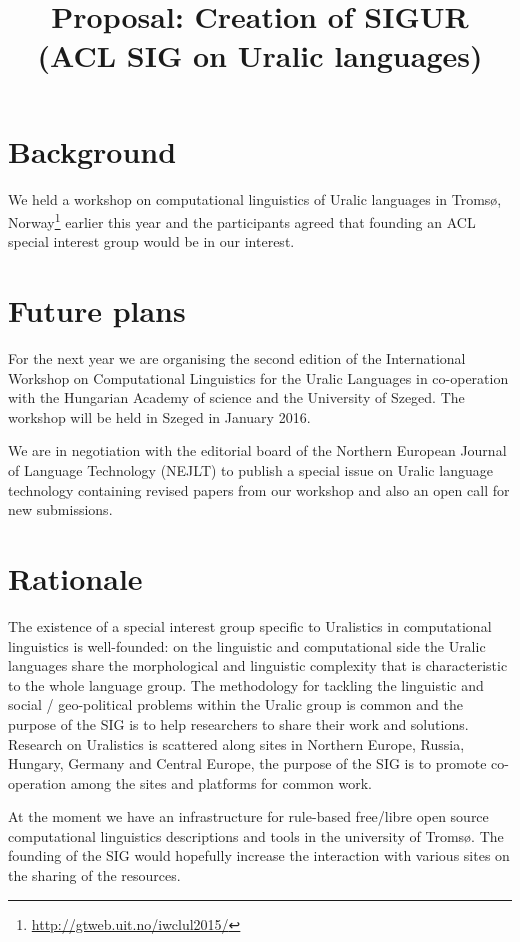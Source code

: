 \documentclass[11pt,a4paper]{article}
\title{Proposal: Creation of SIGUR (ACL SIG on Uralic languages)}
\date{}
\begin{document}
\maketitle

\section*{Background}
We held a workshop on computational linguistics of Uralic languages in 
Tromsø, Norway\footnote{\url{http://gtweb.uit.no/iwclul2015/}} earlier 
this year and the participants agreed that 
founding an ACL special interest group would be in our interest. 

\section*{Future plans}
For the next year we are organising the second edition of the 
International Workshop on Computational Linguistics for the Uralic
Languages  in co-operation with
the Hungarian Academy of science and the University of Szeged. The workshop
will be held in Szeged in January 2016.

We are in negotiation with the editorial board of the
 Northern European Journal of Language Technology (NEJLT) to publish 
a special issue on Uralic language technology containing revised papers
from our workshop and also an open call for new submissions.

\section*{Rationale}
The existence of a special interest group specific to
Uralistics in computational linguistics is well-founded: on the
linguistic and computational side the Uralic languages share the
morphological and linguistic complexity that is characteristic to the whole
language group. The methodology for tackling the linguistic and
social / geo-political problems within the Uralic group is common and
the purpose of the SIG is to help researchers to share their work and
solutions. Research on Uralistics is scattered along sites in Northern
Europe, Russia, Hungary, Germany and Central Europe, the purpose of the
SIG is to promote co-operation among the sites and platforms for 
common work.

At the moment we have an infrastructure for rule-based free/libre open
source computational linguistics descriptions and tools in the
university of Tromsø. The founding of the SIG would hopefully
increase the interaction with various sites on the sharing of the
resources. 
\end{document}

